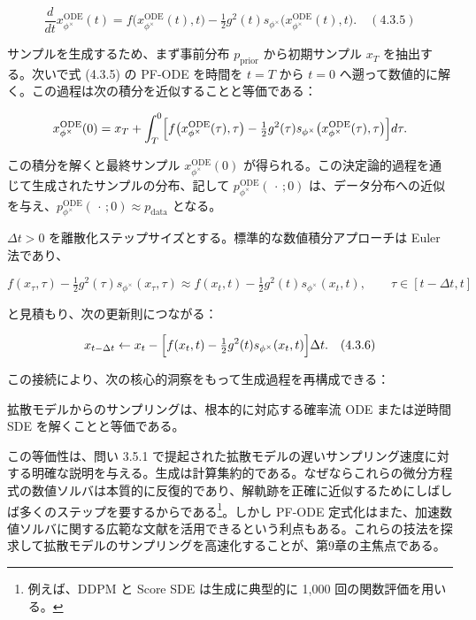 \[
\frac{d}{dt}x_{\phi^\times}^{\mathrm{ODE}}(t)
= f\bigl(x_{\phi^\times}^{\mathrm{ODE}}(t),t\bigr)
- \tfrac12 g^2(t)s_{\phi^\times}\bigl(x_{\phi^\times}^{\mathrm{ODE}}(t),t\bigr). \quad (4.3.5)
\]


サンプルを生成するため、まず事前分布 $p_{\mathrm{prior}}$ から初期サンプル $x_T$ を抽出する。次いで式 (4.3.5) の PF-ODE を時間を $t=T$ から $t=0$ へ遡って数値的に解く。この過程は次の積分を近似することと等価である：

\[
x_{\phi^\times}^{\mathrm{ODE}}(0)
= x_T
+ \int_T^{0}\Bigl[
f\bigl(x_{\phi^\times}^{\mathrm{ODE}}(\tau),\tau\bigr)
- \tfrac12 g^2(\tau)s_{\phi^\times}\bigl(x_{\phi^\times}^{\mathrm{ODE}}(\tau),\tau\bigr)
\Bigr]d\tau.
\]


この積分を解くと最終サンプル $x_{\phi^\times}^{\mathrm{ODE}}(0)$ が得られる。この決定論的過程を通じて生成されたサンプルの分布、記して $p_{\phi^\times}^{\mathrm{ODE}}(\,\cdot\,;0)$ は、データ分布への近似を与え、$p_{\phi^\times}^{\mathrm{ODE}}(\,\cdot\,;0)\approx p_{\mathrm{data}}$ となる。

$\Delta t>0$ を離散化ステップサイズとする。標準的な数値積分アプローチは Euler 法であり、

\[
f(x_\tau,\tau)-\tfrac12 g^2(\tau)s_{\phi^\times}(x_\tau,\tau)
\approx f(x_t,t)-\tfrac12 g^2(t)s_{\phi^\times}(x_t,t),
\qquad \tau\in[t-\Delta t,t]
\]


と見積もり、次の更新則につながる：

\[
x_{t-\Delta t}
\leftarrow x_t
- \Bigl[f(x_t,t)-\tfrac12 g^2(t)s_{\phi^\times}(x_t,t)\Bigr]\Delta t. \quad (4.3.6)
\]


この接続により、次の核心的洞察をもって生成過程を再構成できる：

\begin{propositionbox}
拡散モデルからのサンプリングは、根本的に対応する確率流 ODE または逆時間 SDE を解くことと等価である。
\end{propositionbox}


この等価性は、問い 3.5.1 で提起された拡散モデルの遅いサンプリング速度に対する明確な説明を与える。生成は計算集約的である。なぜならこれらの微分方程式の数値ソルバは本質的に反復的であり、解軌跡を正確に近似するためにしばしば多くのステップを要するからである\footnote{例えば、DDPM と Score SDE は生成に典型的に 1,000 回の関数評価を用いる。}。しかし PF-ODE 定式化はまた、加速数値ソルバに関する広範な文献を活用できるという利点もある。これらの技法を探求して拡散モデルのサンプリングを高速化することが、第9章の主焦点である。

